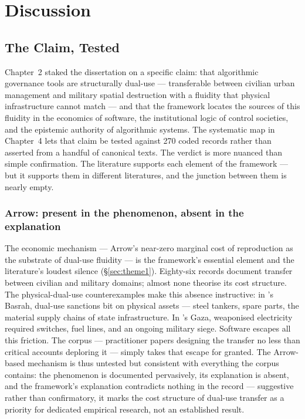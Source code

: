
\chapter{Discussion}
\label{ch:discussion}

\section{The Claim, Tested}
\label{sec:claim-tested}

Chapter~2 staked the dissertation on a specific claim: that algorithmic governance tools are structurally dual-use — transferable between civilian urban management and military spatial destruction with a fluidity that physical infrastructure cannot match — and that the framework locates the sources of this fluidity in the economics of software, the institutional logic of control societies, and the epistemic authority of algorithmic systems. The systematic map in Chapter~4 lets that claim be tested against 270 coded records rather than asserted from a handful of canonical texts. The verdict is more nuanced than simple confirmation. The literature supports each element of the framework — but it supports them in different literatures, and the junction between them is nearly empty.

\subsection{Arrow: present in the phenomenon, absent in the explanation}

The economic mechanism — Arrow's near-zero marginal cost of reproduction as the substrate of dual-use fluidity — is the framework's essential element and the literature's loudest silence (§\ref{sec:theme1}). Eighty-six records document transfer between civilian and military domains; almost none theorise its cost structure. The physical-dual-use counterexamples make this absence instructive: in \textcite{zeitoun2018}'s Basrah, dual-use sanctions bit on physical assets — steel tankers, spare parts, the material supply chains of state infrastructure. In \textcite[p.~8]{salamanca2011}'s Gaza, weaponised electricity required switches, fuel lines, and an ongoing military siege. Software escapes all this friction. The corpus — practitioner papers designing the transfer \parencite{tsiolis2025} no less than critical accounts deploring it \parencite{amoore2009,wall2013} — simply takes that escape for granted. The Arrow-based mechanism is thus untested but consistent with everything the corpus contains: the phenomenon is documented pervasively, its explanation is absent, and the framework's explanation contradicts nothing in the record — suggestive rather than confirmatory, it marks the cost structure of dual-use transfer as a priority for dedicated empirical research, not an established result.

